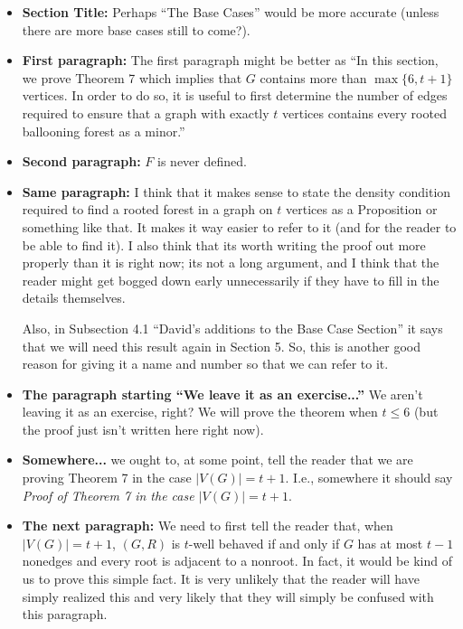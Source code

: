 \documentclass[11 pt]{article}
\theoremstyle{definition}
\theoremstyle{case}
\numberwithin{equation}{section}
\begin{document}
\begin{itemize}
\item\textbf{Section Title:} Perhaps ``The Base Cases'' would be more accurate (unless there are more base cases still to come?). 
\item \textbf{First paragraph:} The first paragraph might be better as ``In this section, we prove Theorem 7 which implies that $G$ contains more than $\max\{6,t+1\}$ vertices. In order to do so, it is useful to first determine the number of edges required to ensure that a graph with exactly $t$ vertices contains every rooted ballooning forest as a minor.'' 
\item \textbf{Second paragraph:} $F$ is never defined. 
\item\textbf{Same paragraph:} I think that it makes sense to state the density condition required to find a rooted forest in a graph on $t$ vertices as a Proposition or something like that. It makes it way easier to refer to it (and for the reader to be able to find it). I also think that its worth writing the proof out more properly than it is right now; its not a long argument, and I think that the reader might get bogged down early unnecessarily if they have to fill in the details themselves.

Also, in Subsection 4.1 ``David's additions to the Base Case Section'' it says that we will need this result again in Section 5. So, this is another good reason for giving it a name and number so that we can refer to it. 
\item \textbf{The paragraph starting ``We leave it as an exercise...''} We aren't leaving it as an exercise, right? We will prove the theorem when $t\leq 6$ (but the proof just isn't written here right now). 
\item \textbf{Somewhere...} we ought to, at some point, tell the reader that we are proving Theorem 7 in the case $|V(G)|=t+1$. I.e., somewhere it should say \emph{Proof of Theorem 7 in the case $|V(G)|=t+1$}. 
\item \textbf{The next paragraph:} We need to first tell the reader that, when $|V(G)|=t+1$, $(G,R)$ is $t$-well behaved if and only if $G$ has at most $t-1$ nonedges and every root is adjacent to a nonroot. In fact, it would be kind of us to prove this simple fact. It is very unlikely that the reader will have simply realized this and very likely that they will simply be confused with this paragraph. 


\end{itemize}
\end{document}
